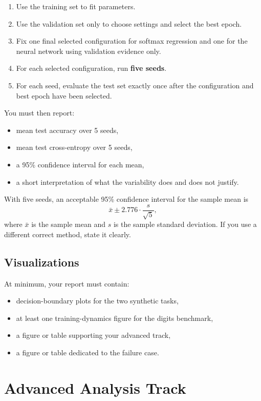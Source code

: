\documentclass[11pt]{article}
\begin{document}
\begin{enumerate}
    \item Use the training set to fit parameters.
    \item Use the validation set only to choose settings and select the best epoch.
    \item Fix one final selected configuration for softmax regression and one for the neural network using validation evidence only.
    \item For each selected configuration, run \textbf{five seeds}.
    \item For each seed, evaluate the test set exactly once after the configuration and best epoch have been selected.
\end{enumerate}

You must then report:

\begin{itemize}
    \item mean test accuracy over 5 seeds,
    \item mean test cross-entropy over 5 seeds,
    \item a 95\% confidence interval for each mean,
    \item a short interpretation of what the variability does and does not justify.
\end{itemize}

With five seeds, an acceptable 95\% confidence interval for the sample mean is
\[
\bar{x} \pm 2.776 \cdot \frac{s}{\sqrt{5}},
\]
where $\bar{x}$ is the sample mean and $s$ is the sample standard deviation. If you use a different correct method, state it clearly.

\subsection{Visualizations}

At minimum, your report must contain:

\begin{itemize}
    \item decision-boundary plots for the two synthetic tasks,
    \item at least one training-dynamics figure for the digits benchmark,
    \item a figure or table supporting your advanced track,
    \item a figure or table dedicated to the failure case.
\end{itemize}

\section{Advanced Analysis Track}
\end{document}
